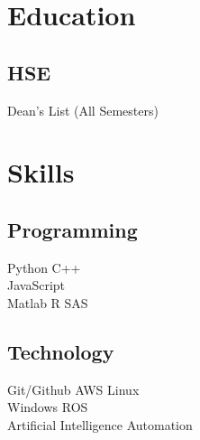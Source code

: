 \documentclass[]{deedy-resume-reversed}
\begin{document}
\begin{minipage}[t]{0.60\textwidth}

% 
% 

%
%

\end{minipage}
\hfill
\begin{minipage}[t]{0.33\textwidth}


\section{Education}

\subsection{HSE}
Dean's List (All Semesters) \\
\sectionsep


\section{Skills}
\subsection{Programming}
Python \textbullet{} C++ \\
JavaScript \\
Matlab \textbullet{} R \textbullet{} SAS \\
\sectionsep

\subsection{Technology}
Git/Github \textbullet{} AWS \textbullet{} Linux \\
Windows \textbullet{} ROS \\
Artificial Intelligence \textbullet{} Automation \\
\sectionsep


\end{minipage}
\end{document}
